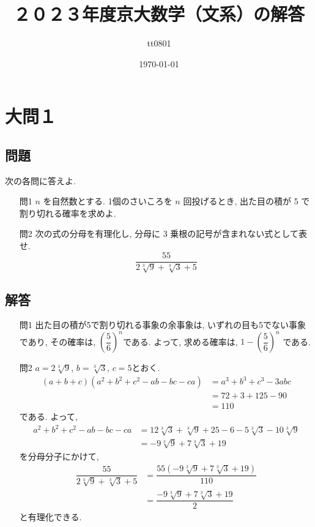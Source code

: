\documentclass[dvipdfmx,a4paper]{jsarticle}
\title{２０２３年度京大数学（文系）の解答}
\author{tt0801}
\date{\today}
\begin{document}
    \maketitle
    \section{大問１}
    \subsection{問題}
    次の各問に答えよ. 

    \begin{itemize}
        \item [問1] \quad $n$ を自然数とする. 1個のさいころを $n$ 回投げるとき, 出た目の積が 5 で割り切れる確率を求めよ. 
        \item [問2] \quad 次の式の分母を有理化し, 分母に 3 乗根の記号が含まれない式として表せ. 
            \[
                \frac{55}{2 \sqrt[3]{9} + \sqrt[3]{3} + 5}
            \]
    \end{itemize}

    \subsection{解答}
    \begin{itemize}
        \item [問1] \quad 出た目の積が5で割り切れる事象の余事象は, いずれの目も5でない事象であり, 
            その確率は, $\left(\dfrac{5}{6}\right)^n$である. よって, 求める確率は, $1-\left(\dfrac{5}{6}\right)^n$
            である. 
        \item [問2] \quad $a=2 \sqrt[3]{9}$, $b=\sqrt[3]{3}$, $c=5$とおく. 
        \begin{align*}
            (a + b +c)(a^2 + b^2 + c^2 - ab -bc -ca) &= a^3 + b^3 + c^3 -3abc \\
            &= 72 + 3 + 125 -90 \\
            &= 110
        \end{align*}
        である. よって, 
        \begin{align*}
            a^2 + b^2 + c^2 - ab -bc -ca 
            &= 12 \sqrt[3]{3} + \sqrt[3]{9} + 25 - 6 -5\sqrt[3]{3} - 10\sqrt[3]{9} \\
            &= -9 \sqrt[3]{9} + 7 \sqrt[3]{3} + 19
        \end{align*}
        を分母分子にかけて, 
        \begin{align*}
            \dfrac{55}{2 \sqrt[3]{9} + \sqrt[3]{3} + 5}
            &= \dfrac{55(-9 \sqrt[3]{9} + 7 \sqrt[3]{3} + 19)}{110} \\
            &= \dfrac{-9 \sqrt[3]{9} + 7 \sqrt[3]{3} + 19}{2}
        \end{align*}
        と有理化できる. 
    \end{itemize}
\end{document}
